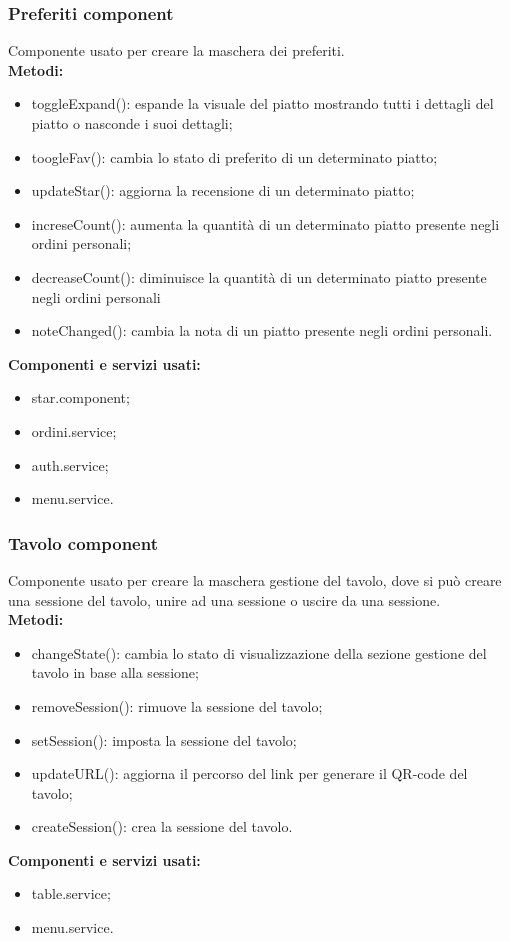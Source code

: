 \subsubsection{Preferiti component}
Componente usato per creare la maschera dei preferiti.\\
\textbf{Metodi:}
\begin{itemize}
    \item toggleExpand(): espande la visuale del piatto mostrando tutti i dettagli del piatto o nasconde i suoi dettagli;
    \item toogleFav(): cambia lo stato di preferito di un determinato piatto;
    \item updateStar(): aggiorna la recensione di un determinato piatto;
    \item increseCount(): aumenta la quantità di un determinato piatto presente negli ordini personali;
    \item decreaseCount(): diminuisce la quantità di un determinato piatto presente negli ordini personali
    \item noteChanged(): cambia la nota di un piatto presente negli ordini personali.
\end{itemize}
\textbf{Componenti e servizi usati:}
\begin{itemize}
    \item star.component;
    \item ordini.service;
    \item auth.service;
    \item menu.service.
\end{itemize}

\subsubsection{Tavolo component}
Componente usato per creare la maschera gestione del tavolo, dove si può creare una sessione del tavolo, unire ad una sessione o uscire da una sessione.\\
\textbf{Metodi:}
\begin{itemize}
    \item changeState(): cambia lo stato di visualizzazione della sezione gestione del tavolo in base alla sessione;
    \item removeSession(): rimuove la sessione del tavolo;
    \item setSession(): imposta la sessione del tavolo;
    \item updateURL(): aggiorna il percorso del link per generare il QR-code del tavolo;
    \item createSession(): crea la sessione del tavolo.
\end{itemize}
\textbf{Componenti e servizi usati:}
\begin{itemize}
    \item table.service;
    \item menu.service.
\end{itemize}

